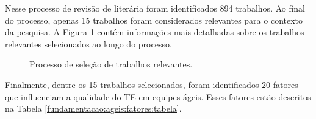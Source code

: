 Nesse processo de revisão de literária foram identificados 894 trabalhos. Ao final do processo, apenas 15 trabalhos foram considerados relevantes para o contexto da pesquisa. A Figura \ref{fundamentacao:ageis:fatores:revisao} contém informações mais detalhadas sobre os trabalhos relevantes selecionados ao longo do processo.

\begin{figure}[ht!]
\begin{center}
    \end{center}
    \caption{Processo de seleção de trabalhos relevantes.}
    \label{fundamentacao:ageis:fatores:revisao}
\end{figure}

Finalmente, dentre os 15 trabalhos selecionados, foram identificados 20 fatores que influenciam a qualidade do TE em equipes ágeis. Esses fatores estão descritos na Tabela \ref{fundamentacao:ageis:fatores:tabela}.


